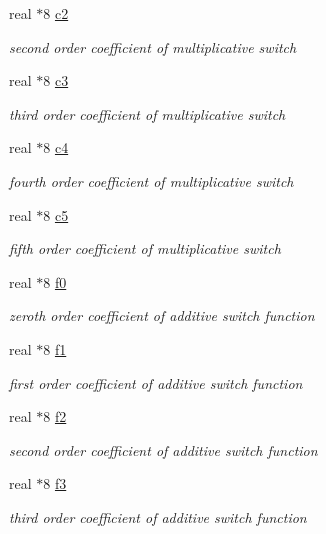 \begin{DoxyCompactItemize}
real $\ast$8 \hyperlink{classshunt_a17753b6e4291d434b9716b57c316f34c}{c2}
\begin{DoxyCompactList}\small\item\em second order coefficient of multiplicative switch \end{DoxyCompactList}\item 
real $\ast$8 \hyperlink{classshunt_a3e2ec36e1f551a9f6ae83d81578101b6}{c3}
\begin{DoxyCompactList}\small\item\em third order coefficient of multiplicative switch \end{DoxyCompactList}\item 
real $\ast$8 \hyperlink{classshunt_a24fede963dce84d5d0976925f61a204b}{c4}
\begin{DoxyCompactList}\small\item\em fourth order coefficient of multiplicative switch \end{DoxyCompactList}\item 
real $\ast$8 \hyperlink{classshunt_a9de80047e037b8994437ddf76355aed4}{c5}
\begin{DoxyCompactList}\small\item\em fifth order coefficient of multiplicative switch \end{DoxyCompactList}\item 
real $\ast$8 \hyperlink{classshunt_a49fe4b8934cbab0b3913f62b2af5e672}{f0}
\begin{DoxyCompactList}\small\item\em zeroth order coefficient of additive switch function \end{DoxyCompactList}\item 
real $\ast$8 \hyperlink{classshunt_a7f8f77ed7dcca9e92816b77eb9268045}{f1}
\begin{DoxyCompactList}\small\item\em first order coefficient of additive switch function \end{DoxyCompactList}\item 
real $\ast$8 \hyperlink{classshunt_af183f88df860d77867c52354f0de006b}{f2}
\begin{DoxyCompactList}\small\item\em second order coefficient of additive switch function \end{DoxyCompactList}\item 
real $\ast$8 \hyperlink{classshunt_a945be9c9b02dda1e684732dc3d84c607}{f3}
\begin{DoxyCompactList}\small\item\em third order coefficient of additive switch function \end{DoxyCompactList}\item 

\end{DoxyCompactItemize}
